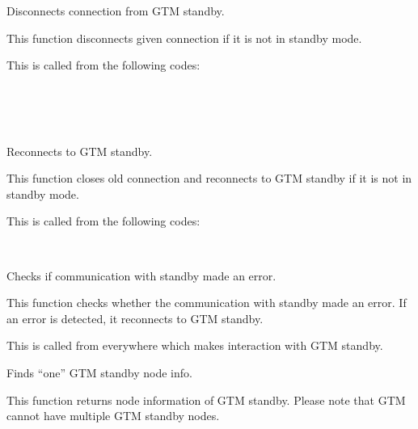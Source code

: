   
    Disconnects connection from GTM standby.
    
    This function disconnects given connection if it is not in standby mode.
    
    This is called from the following codes:
    
    \FuncRefHdr
		\\
		\\
		\\ \hline
    \FuncRefTrailor
  
  
    Reconnects to GTM standby.
    
    This function closes old connection and reconnects to GTM standby if it is not in standby mode.
    
    This is called from the following codes:
    
    \FuncRefHdr
		\\ \hline
    \FuncRefTrailor
  
  
    Checks if communication with standby made an error.
    
    This function checks whether the communication with standby made an error.
	If an error is detected, it reconnects to GTM standby.
    
    This is called from everywhere which makes interaction with GTM standby.
  
  
    Finds ``one'' GTM standby node info.
    
    This function returns node information of GTM standby.
    Please note that GTM cannot have multiple GTM standby nodes.
    
